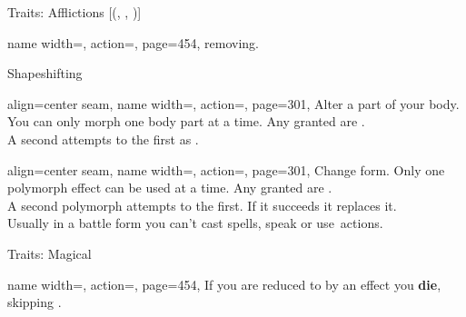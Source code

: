 \begin{PageFront}
\begin{Tables}{\frontTableHeight}
\begin{Table}{Traits: Afflictions }[{(, , )}]
\begin{entry}{}{%
                name width=\conditionLength,%
                action=\Curse,
                page=454,
            }
                removing.
            \end{entry}
        \end{Table}
        \TableSpace
        \begin{Table}{Shapeshifting}
            \begin{entry}{}{%
                align=center seam,
                name width=\conditionLength,%
                action=\Morph,
                page=301,
            }
                Alter a part of your body. You can only morph one body part at a time. Any 
                granted are \Magical. \hfill {}
                \\
                A second attempts to  the first as \Polymorph.\hfill {}
            \end{entry}
            \begin{entry}{}{%
                align=center seam,
                name width=\conditionLength,%
                action=\Polymorph,
                page=301,
            }
                Change form. Only one polymorph effect can be used at a time. Any  granted are
                \Magical. \hfill {}
                \\A second polymorph attempts to  the first. If it succeeds it replaces it. \\
                Usually in a battle form you can't cast spells, speak or use \Manipulate\,actions. \hfill {}
            \end{entry}
        \end{Table}
    \end{Tables}%
    \begin{Tables}{\frontTableHeight}
        \renewcommand{\TableSpace}{\\\vspace{2mm}\\}%
        \begin{Table}{Traits: Magical}
            \begin{entry}{}{%
                name width=\conditionLength,%
                action=\Death,
                page=454,
            }
                If you are reduced to  \HPs by an effect you \textbf{die}, skipping .
            \end{entry}

\end{Table}
\end{Tables}
\end{PageFront}
